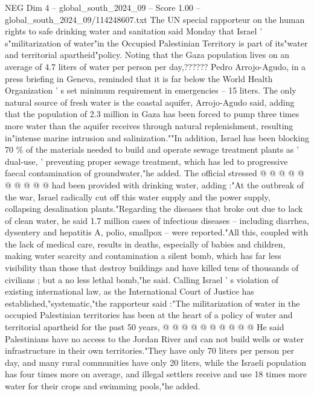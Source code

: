 \begin{textsample}{NEG Dim 4 – global\_south\_2024\_09 – Score 1.00 – global\_south\_2024\_09/114248607.txt}  \label{ex:f4_neg_169}
The UN special rapporteur on the human rights to safe drinking water and sanitation said Monday that Israel ' s"militarization of water"in the Occupied Palestinian Territory is part of its"water and territorial apartheid"policy.
Noting that the Gaza population lives on an average of 4.7 liters of water per person per day,??????
Pedro Arrojo-Agudo, in a press briefing in Geneva, reminded that it is far below the World Health Organization ' s set minimum requirement in emergencies -- 15 liters.
The only natural source of fresh water is the coastal aquifer, Arrojo-Agudo said, adding that the population of 2.3 million in Gaza has been forced to pump three times more water than the aquifer receives through natural replenishment, resulting in"intense marine intrusion and salinization.""In addition, Israel has been blocking 70 \% of the materials needed to build and operate sewage treatment plants as ' dual-use, ' preventing proper sewage treatment, which has led to progressive faecal contamination of groundwater,"he added.
The official stressed @ @ @ @ @ @ @ @ @ @ had been provided with drinking water, adding :"At the outbreak of the war, Israel radically cut off this water supply and the power supply, collapsing desalination plants."Regarding the diseases that broke out due to lack of clean water, he said 1.7 million cases of infectious diseases -- including diarrhea, dysentery and hepatitis A, polio, smallpox -- were reported."All this, coupled with the lack of medical care, results in deaths, especially of babies and children, making water scarcity and contamination a silent bomb, which has far less visibility than those that destroy buildings and have killed tens of thousands of civilians ; but a no less lethal bomb,"he said.
Calling Israel ' s violation of existing international law, as the International Court of Justice has established,"systematic,"the rapporteur said :"The militarization of water in the occupied Palestinian territories has been at the heart of a policy of water and territorial apartheid for the past 50 years, @ @ @ @ @ @ @ @ @ @ He said Palestinians have no access to the Jordan River and can not build wells or water infrastructure in their own territories."They have only 70 liters per person per day, and many rural communities have only 20 liters, while the Israeli population has four times more on average, and illegal settlers receive and use 18 times more water for their crops and swimming pools,"he added.

\end{textsample}
